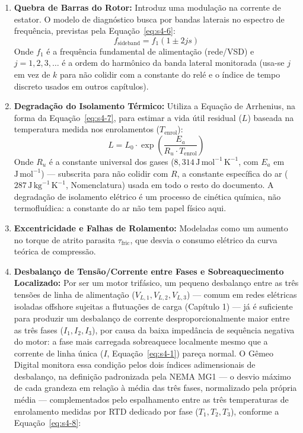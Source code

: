 \documentclass[12pt,a4paper]{article}
\numberwithin{equation}{section}
\numberwithin{table}{section}
\numberwithin{figure}{section}
\begin{document}
{	\begin{enumerate}
		\item \textbf{Quebra de Barras do Rotor:} Introduz uma modulação na corrente de estator. O modelo de diagnóstico busca por bandas laterais no espectro de frequência, previstas pela Equação~\eqref{eq:s4-6}:
		\begin{equation}\label{eq:s4-6}
 f_{\text{sideband}} = f_1 (1 \pm 2js) 
\end{equation}
		Onde $f_1$ é a frequência fundamental de alimentação (rede/VSD) e $j = 1, 2, 3, \dots$ é a ordem do harmônico da banda lateral monitorada (usa-se $j$ em vez de $k$ para não colidir com a constante do relé e o índice de tempo discreto usados em outros capítulos).
		\item \textbf{Degradação do Isolamento Térmico:} Utiliza a Equação de Arrhenius, na forma da Equação~\eqref{eq:s4-7}, para estimar a vida útil residual ($L$) baseada na temperatura medida nos enrolamentos ($T_{\text{enrol}}$):
		\begin{equation}\label{eq:s4-7}
 L = L_0 \cdot \exp \left( \frac{E_a}{R_u \cdot T_{\text{enrol}}} \right)
\end{equation}
		Onde $R_u$ é a constante universal dos gases ($8{,}314\,\text{J}\,\text{mol}^{-1}\,\text{K}^{-1}$, com $E_a$ em $\text{J}\,\text{mol}^{-1}$) — subscrita para não colidir com $R$, a constante específica do ar ($287\,\text{J}\,\text{kg}^{-1}\,\text{K}^{-1}$, Nomenclatura) usada em todo o resto do documento. A degradação de isolamento elétrico é um processo de cinética química, não termofluídica: a constante do ar não tem papel físico aqui.
		\item \textbf{Excentricidade e Falhas de Rolamento:} Modeladas como um aumento no torque de atrito parasita $\tau_{\text{fric}}$, que desvia o consumo elétrico da curva teórica de compressão.
		\item \textbf{Desbalanço de Tensão/Corrente entre Fases e Sobreaquecimento Localizado:} Por ser um motor trifásico, um pequeno desbalanço entre as três tensões de linha de alimentação ($V_{L,1}, V_{L,2}, V_{L,3}$) — comum em redes elétricas isoladas offshore sujeitas a flutuações de carga (Capítulo 1) — já é suficiente para produzir um desbalanço de corrente desproporcionalmente maior entre as três fases ($I_1, I_2, I_3$), por causa da baixa impedância de sequência negativa do motor: a fase mais carregada sobreaquece localmente mesmo que a corrente de linha única ($I$, Equação~\eqref{eq:s4-1}) pareça normal. O Gêmeo Digital monitora essa condição pelos dois índices adimensionais de desbalanço, na definição padronizada pela NEMA MG1 \cite{nemamg1} — o desvio máximo de cada grandeza em relação à média das três fases, normalizado pela própria média — complementados pelo espalhamento entre as três temperaturas de enrolamento medidas por RTD dedicado por fase ($T_1, T_2, T_3$), conforme a Equação~\eqref{eq:s4-8}:

\end{enumerate}}
\end{document}
